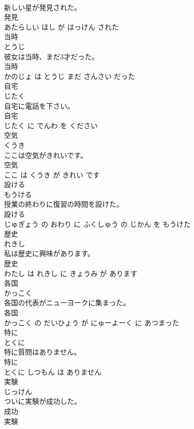 \documentclass[8pt]{extreport}
\begin{document}
\begin{CJK}{UTF8}{min}
\\	新しい星が発見された。	
\\	発見 
\\	あたらしい ほし が はっけん された			
\\	当時	
\\	とうじ			
\\	彼女は当時、まだ3才だった。	
\\	当時 
\\	かのじょ は とうじ まだ さんさい だった			
\\	自宅	
\\	じたく			
\\	自宅に電話を下さい。	
\\	自宅 
\\	じたく に でんわ を ください			
\\	空気	
\\	くうき			
\\	ここは空気がきれいです。	
\\	空気 
\\	ここ は くうき が きれい です			
\\	設ける	
\\	もうける			
\\	授業の終わりに復習の時間を設けた。	
\\	設ける 
\\	じゅぎょう の おわり に ふくしゅう の じかん を もうけた			
\\	歴史	
\\	れきし			
\\	私は歴史に興味があります。	
\\	歴史 
\\	わたし は れきし に きょうみ が あります			
\\	各国	
\\	かっこく			
\\	各国の代表がニューヨークに集まった。	
\\	各国 
\\	かっこく の だいひょう が にゅーよーく に あつまった			
\\	特に	
\\	とくに			
\\	特に質問はありません。	
\\	特に 
\\	とくに しつもん は ありません			
\\	実験	
\\	じっけん			
\\	ついに実験が成功した。	
\\	成功 
\\	実験 

\end{CJK}
\end{document}
